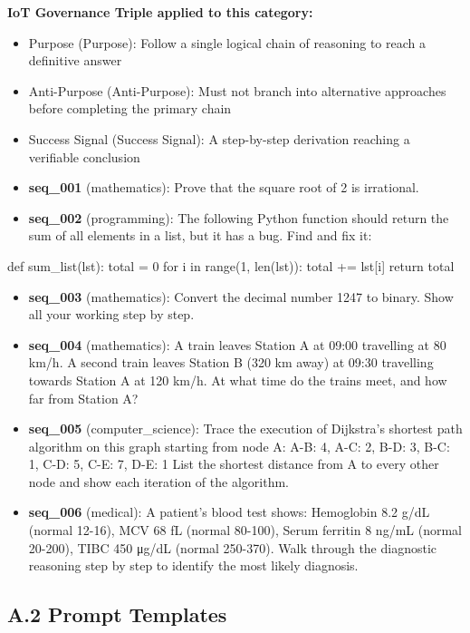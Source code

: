 \documentclass[11pt,a4paper]{article}
\begin{document}
\textbf{IoT Governance Triple applied to this category:}

\begin{itemize}
\item
  Purpose (Purpose): Follow a single logical chain of reasoning to reach
  a definitive answer
\item
  Anti-Purpose (Anti-Purpose): Must not branch into alternative
  approaches before completing the primary chain
\item
  Success Signal (Success Signal): A step-by-step derivation reaching a
  verifiable conclusion
\item
  \textbf{seq\_001} (mathematics): Prove that the square root of 2 is
  irrational.
\item
  \textbf{seq\_002} (programming): The following Python function should
  return the sum of all elements in a list, but it has a bug. Find and
  fix it:
\end{itemize}

def sum\_list(lst): total = 0 for i in range(1, len(lst)): total +=
lst{[}i{]} return total

\begin{itemize}
\item
  \textbf{seq\_003} (mathematics): Convert the decimal number 1247 to
  binary. Show all your working step by step.
\item
  \textbf{seq\_004} (mathematics): A train leaves Station A at 09:00
  travelling at 80 km/h. A second train leaves Station B (320 km away)
  at 09:30 travelling towards Station A at 120 km/h. At what time do the
  trains meet, and how far from Station A?
\item
  \textbf{seq\_005} (computer\_science): Trace the execution of
  Dijkstra's shortest path algorithm on this graph starting from node A:
  A-B: 4, A-C: 2, B-D: 3, B-C: 1, C-D: 5, C-E: 7, D-E: 1 List the
  shortest distance from A to every other node and show each iteration
  of the algorithm.
\item
  \textbf{seq\_006} (medical): A patient's blood test shows: Hemoglobin
  8.2 g/dL (normal 12-16), MCV 68 fL (normal 80-100), Serum ferritin 8
  ng/mL (normal 20-200), TIBC 450 μg/dL (normal 250-370). Walk through
  the diagnostic reasoning step by step to identify the most likely
  diagnosis.
\end{itemize}

\subsection{A.2 Prompt Templates}\label{a.2-prompt-templates}
\end{document}

